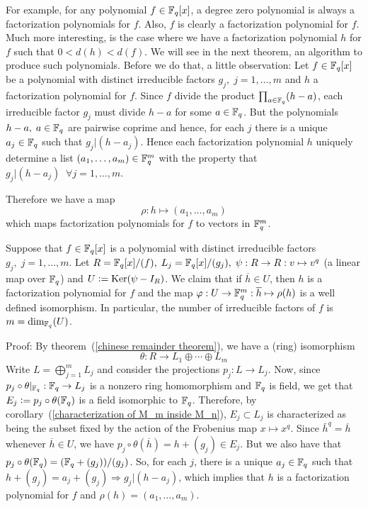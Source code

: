 For example, for any polynomial $f\in\mathbb{F}_q[x]$, a degree zero polynomial is always a factorization polynomials for $f$. Also, $f$ is clearly a factorization polynomial for $f$. Much more interesting, is the case where we have a factorization polynomial $h$ for $f$ such that $0<d(h)<d(f)$. We will see in the next theorem, an algorithm to produce such polynomials. Before we do that, a little observation: Let $f\in\mathbb{F}_q[x]$ be a polynomial with distinct irreducible factors $g_j, \;j=1,\dots,m$ and $h$ a factorization polynomial for $f$. Since $f$ divide the product $\prod_{a\in\mathbb{F}_q}(h-a)$, each irreducible factor $g_j$ must divide $h-a$ for some $a\in\mathbb{F}_q$. But the polynomials $h-a,\;a\in\mathbb{F}_q$ are pairwise coprime and hence, for each $j$ there is a unique $a_j\in\mathbb{F}_q$ such that $g_j|(h-a_j)$. Hence each factorization polynomial $h$ uniquely determine a list $(a_1,\dots,a_m)\in\mathbb{F}_q^m$ with the property that $g_j |(h-a_j)\;\;\forall j=1,\dots,m$. 
\par
Therefore we have a map
\begin{equation}
    \rho: h \mapsto (a_1,\dots,a_m)
\end{equation}
which maps factorization polynomials for $f$ to vectors in $\mathbb{F}_q^m$.
\begin{dang}
    \begin{theorem}\cite{isaacs2009algebra}\label{dim(U) gives the number of irreducible factors}
        Suppose that $f\in\mathbb{F}_q[x]$ is a polynomial with distinct irreducible factors $g_j,\;j=1,\dots,m$. Let $R=\mathbb{F}_q[x]/(f),\; L_j=\mathbb{F}_q[x]/(g_j),\;\psi:R\rightarrow R: v\mapsto v^q$ (a linear map over $\mathbb{F}_q$) and $U\bydef\text{Ker}(\psi-I_R)$. We claim that if $\overline{h}\in U$, then $h$ is a factorization polynomial for $f$ and the map $\varphi:U\rightarrow\mathbb{F}_q^m:\overline{h}\mapsto\rho(h)$ is a well defined isomorphism. In particular, the number of irreducible factors of $f$ is $m=\text{dim}_{\mathbb{F}_q}(U)$.
    \end{theorem}
\end{dang}
Proof: By theorem~(\ref{chinese remainder theorem}), we have a (ring) isomorphism
\begin{equation}
    \theta: R\rightarrow L_1\oplus\cdots\oplus L_m
\end{equation}
Write $L=\bigoplus_{j=1}^m L_j$ and consider the projections $p_j: L\rightarrow L_j$. Now, since $p_j\circ \theta |_{\mathbb{F}_q} : \mathbb{F}_q\rightarrow L_j$ is a nonzero ring homomorphism and $\mathbb{F}_q$ is field, we get that $E_j\bydef p_j\circ\theta(\fq)$ is a field isomorphic to $\mathbb{F}_q$. Therefore, by corollary~(\ref{characterization of M_m inside M_n}), $E_j\subset L_j$ is characterized as being the subset fixed by the action of the Frobenius map $x\mapsto x^q$. Since $\bar{h}^q=\overline{h}$ whenever $\overline{h}\in U$, we have $p_j\circ\theta(\overline{h})=h+(g_j)\in E_j$. But we also have that $p_j\circ\theta(\mathbb{F}_q)=(\mathbb{F}_q+(g_j))/(g_j)$. So, for each $j$, there is a unique $a_j\in\mathbb{F}_q$ such that $h+(g_j)=a_j+(g_j)\Rightarrow g_j|(h-a_j)$, which implies that $h$ is a factorization polynomial for $f$ and $\rho(h)=(a_1,\dots,a_m)$.\par
